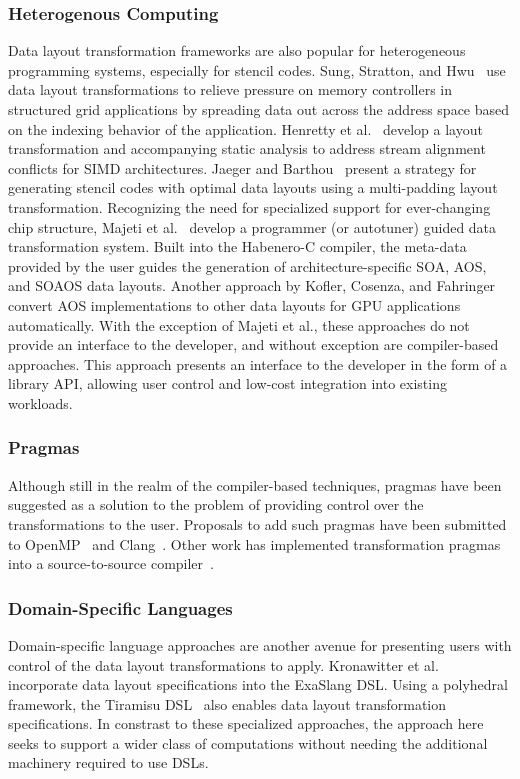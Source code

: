 \subsubsection{Heterogenous Computing}
Data layout transformation frameworks are also popular for heterogeneous programming systems, especially for stencil codes.
Sung, Stratton, and Hwu~\cite{sung2010data} use data layout transformations to relieve pressure on memory controllers in structured grid applications by spreading data out across the address space based on the indexing behavior of the application.
Henretty et al.~\cite{henretty2011data} develop a layout transformation and accompanying static analysis to address stream alignment conflicts for SIMD architectures.
Jaeger and Barthou~\cite{jaeger2012automatic} present a strategy for generating stencil codes with optimal data layouts using a multi-padding layout transformation.
Recognizing the need for specialized support for ever-changing chip structure, Majeti et al.~\cite{majeti2013compiler} develop a programmer (or autotuner) guided data transformation system.
Built into the Habenero-C compiler, the meta-data provided by the user guides the generation of architecture-specific SOA, AOS, and SOAOS data layouts.
Another approach by Kofler, Cosenza, and Fahringer~\cite{kofler2015automatic} convert AOS implementations to other data layouts for GPU applications automatically.  
With the exception of Majeti et al., these approaches do not provide an interface to the developer, and without exception are compiler-based approaches.
This approach presents an interface to the developer in the form of a library API, allowing user control and low-cost integration into existing workloads.

\subsubsection{Pragmas}
Although still in the realm of the compiler-based techniques, pragmas have been suggested as a solution to the problem of providing control over the transformations to the user.
Proposals to add such pragmas have been submitted to OpenMP~\cite{kruse2019design} and Clang~\cite{kruse2018user}.
Other work has implemented transformation pragmas into a source-to-source compiler~\cite{xu2014semi}. 

\subsubsection{Domain-Specific Languages}
Domain-specific language approaches are another avenue for presenting users with control of the data layout transformations to apply. 
Kronawitter et al.~\cite{kronawitter2018automatic} incorporate data layout specifications into the ExaSlang DSL.
Using a polyhedral framework, the Tiramisu DSL~\cite{baghdadi2019tiramisu} also enables data layout transformation specifications.
In constrast to these specialized approaches, the approach here seeks to support a wider class of computations without needing the additional machinery required to use DSLs. 


